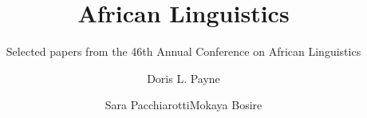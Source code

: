 
\title{African Linguistics} 
\subtitle{Selected papers from the 46th Annual Conference on African Linguistics}
\author{Doris L. Payne\and\newlineCover Sara Pacchiarotti\lastand\newlineCover Mokaya Bosire} %

\renewcommand{\lsISBN}{978-0-000000-00-0}                      
\renewcommand{\lsSeries}{calseries}
\renewcommand{\lsSeriesNumber}{2} 
\renewcommand{\lsURL}{http://langsci-press.org/catalog/book/00} %